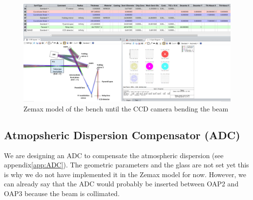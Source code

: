 \documentclass[12pt,a4paper]{article}
\begin{document}
\begin{figure}[H]
	\begin{center}
		\includegraphics[width=\textwidth]{images/Zemax_model_FP_CCD_foldMirror.PNG}
		\caption{Zemax model of the bench until the CCD camera bending the beam}\label{fig:Zemax_model_FP_CCD_foldMirror}
	\end{center}
\end{figure}

\subsection{Atmopsheric Dispersion Compensator (ADC)}
We are designing an ADC to compensate the atmospheric dispersion (see appendix\ref{app:ADC}). The geometric parameters and the glass are not set yet this is why we do not have implemented it in the Zemax model for now. However, we can already say that the ADC would probably be inserted between OAP2 and OAP3 because the beam is collimated.
\newpage

\renewcommand{\bibname}{References}


\end{document}
